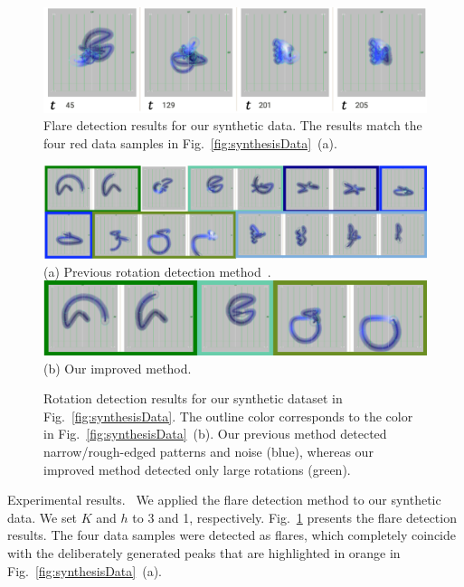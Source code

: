 \begin{figure}[tb]
    \centering
    \includegraphics[width=.85\linewidth]{vgtc_journal_latex/figures/flareDetectiondemodataResults.png}
    \caption{Flare detection results for our synthetic data. The results match the four red data samples in Fig.~\ref{fig:synthesisData}~(a).}
    \label{fig:flareDetection}
\end{figure}
\begin{figure}[tb]
    \centering
    \includegraphics[width=\linewidth]{vgtc_journal_latex/figures/rotationDetectiondemodataResultsOR.png}\\
    \footnotesize{\sf(a) Previous rotation detection method~\cite{Fujishiro2018}.}\\
    \vspace{5px}
    \includegraphics[width=.8\linewidth]{vgtc_journal_latex/figures/rotationDetectiondemodataResults.png}\\
    \footnotesize{\sf(b) Our improved method.}
    \caption{Rotation detection results for our synthetic dataset in Fig.~\ref{fig:synthesisData}. 
        The outline color corresponds to the color in Fig.~\ref{fig:synthesisData}~(b).
        Our previous method detected narrow/rough-edged patterns and noise (blue), 
        whereas our improved method detected only large rotations (green).}
    \label{fig:rotationResults}
\end{figure}

\textsf{Experimental results.\ } We applied the flare detection method to our synthetic data.
We set $K$ and $h$ to 3 and 1, respectively.
Fig.~\ref{fig:flareDetection} presents the flare detection results.
The four data samples were detected as flares,
which completely coincide with the deliberately generated peaks that are highlighted in orange in Fig.~\ref{fig:synthesisData}~(a).

